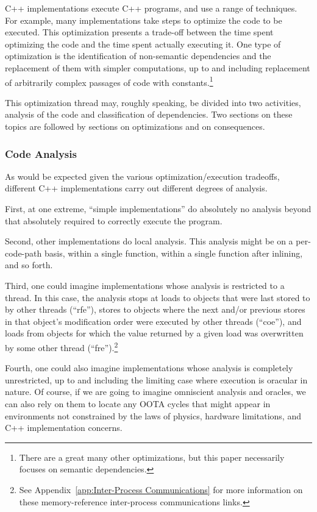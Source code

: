 \documentclass[10]{article}
\begin{document}
C++ implementations execute C++ programs, and use a range of techniques.
For example, many implementations take steps to optimize the code to
be executed.
This optimization presents a trade-off between the time spent optimizing
the code and the time spent actually executing it.
One type of optimization is the identification of non-semantic dependencies
and the replacement of them with simpler computations, up to and including
replacement of arbitrarily complex passages of code with constants.\footnote{
	There are a great many other optimizations, but this paper
	necessarily focuses on semantic dependencies.}

This optimization thread may, roughly speaking, be divided into two
activities, analysis of the code and classification of dependencies.
Two sections on these topics are followed by sections on optimizations
and on consequences.

\subsubsection{Code Analysis}
\label{sec:Code Analysis}

As would be expected given the various optimization/execution tradeoffs,
different C++ implementations carry out different degrees of analysis.

First, at one extreme, ``simple implementations'' do absolutely no
analysis beyond that absolutely required to correctly execute the program.

Second, other implementations do local analysis.
This analysis might be on a per-code-path basis, within a single function,
within a single function after inlining, and so forth.

Third, one could imagine implementations whose analysis is restricted to
a thread.
In this case, the analysis stops at loads to objects that were last
stored to by other threads (``rfe''), stores to objects where the next
and/or previous stores in that object's modification order were executed
by other threads (``coe''), and loads from objects for which the value
returned by a given load was overwritten by some other thread
(``fre'').\footnote{
	See Appendix~\ref{app:Inter-Process Communications} for more
	information on these memory-reference inter-process communications
	links.}

Fourth, one could also imagine implementations whose analysis is
completely unrestricted, up to and including the limiting case where
execution is oracular in nature.
Of course, if we are going to imagine omniscient analysis and oracles,
we can also rely on them to locate any OOTA cycles that might appear
in environments not constrained by the laws of physics, hardware
limitations, and C++ implementation concerns.
\end{document}
